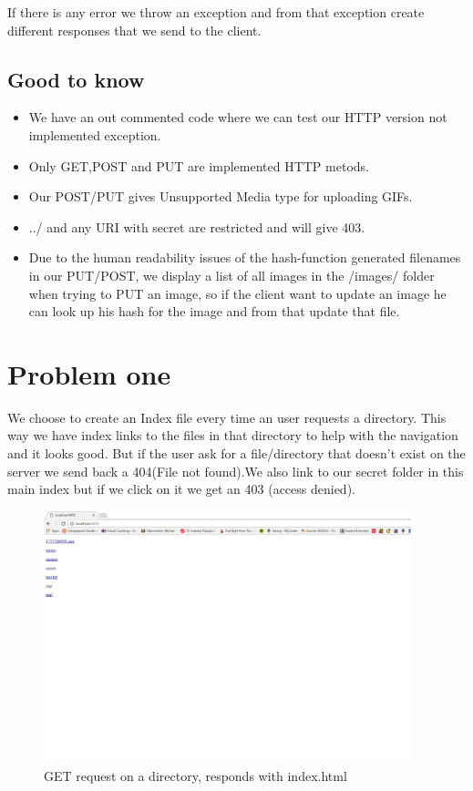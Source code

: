\documentclass[a4paper,12pt]{article}
\numberwithin{figure}{section}
\begin{document}
If there is any error we throw an exception and from that exception create different responses that we send to the client. 


\subsection{Good to know}
\begin{itemize}
	\item We have an out commented code where we can test our HTTP version not implemented exception. 
	
	\item Only GET,POST and PUT are implemented HTTP metods.
	
	\item Our POST/PUT gives Unsupported Media type for uploading GIFs.
	
	\item ../ and any URI with secret are restricted and will give 403.
	
	\item Due to the human readability issues of the hash-function generated filenames in our PUT/POST, we display a list of all images in the /images/ folder when trying to PUT an image, so if the client want to update an image he can look up his hash for the image and from that update that file.
\end{itemize}

\newpage

\section{Problem one}

We choose to create an Index file every time an user requests a directory. This way we have index links to the files in that directory to help with the navigation and it looks good. But if the user ask for a file/directory that doesn't exist on the server we send back a 404(File not found).We also link to our secret folder in this main index but if we click on it we get an 403 (access denied).
 
\begin{figure}[h!]
	\centering
	\label{Directory}
	\includegraphics[width=0.95\textwidth,keepaspectratio]{img/Directory.jpg} 
	\caption{GET request on a directory, responds with index.html}
\end{figure}
\end{document}
